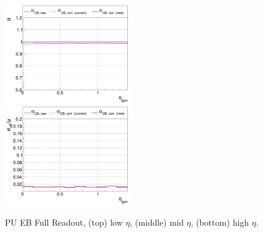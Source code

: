 \begin{figure}
\includegraphics[width=0.495\textwidth]{./plots_pdf/ECAL_plots/plotsPU/EB/FULL/pdf/GENETA/EBFULL_GENETA_0100_0300_MuOverBins.pdf}
\includegraphics[width=0.495\textwidth]{./plots_pdf/ECAL_plots/plotsPU/EB/FULL/pdf/GENETA/EBFULL_GENETA_0100_0300_EffSigmaOverBins.pdf}

\caption{PU EB Full Readout, (top) low $\eta$, (middle) mid $\eta$, (bottom) high $\eta$.}
\label{fig:PU_EBFULL_eta}
\end{figure}








